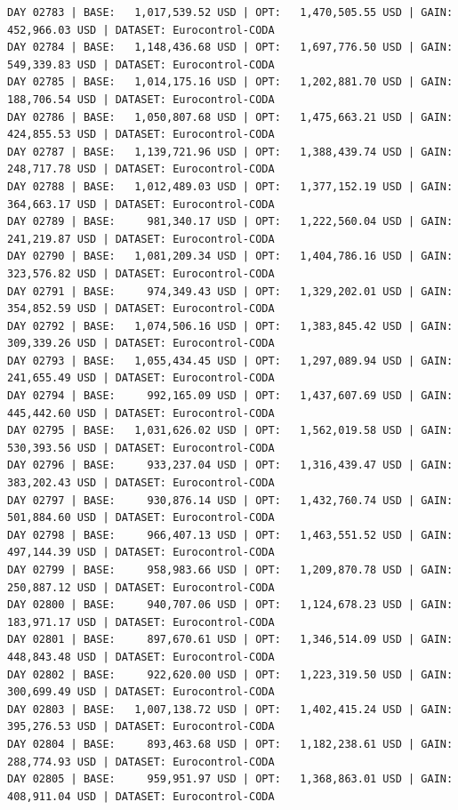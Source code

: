 \documentclass[11pt,a4paper]{article}
\begin{document}
\begin{verbatim}
DAY 02783 | BASE:   1,017,539.52 USD | OPT:   1,470,505.55 USD | GAIN: 452,966.03 USD | DATASET: Eurocontrol-CODA
DAY 02784 | BASE:   1,148,436.68 USD | OPT:   1,697,776.50 USD | GAIN: 549,339.83 USD | DATASET: Eurocontrol-CODA
DAY 02785 | BASE:   1,014,175.16 USD | OPT:   1,202,881.70 USD | GAIN: 188,706.54 USD | DATASET: Eurocontrol-CODA
DAY 02786 | BASE:   1,050,807.68 USD | OPT:   1,475,663.21 USD | GAIN: 424,855.53 USD | DATASET: Eurocontrol-CODA
DAY 02787 | BASE:   1,139,721.96 USD | OPT:   1,388,439.74 USD | GAIN: 248,717.78 USD | DATASET: Eurocontrol-CODA
DAY 02788 | BASE:   1,012,489.03 USD | OPT:   1,377,152.19 USD | GAIN: 364,663.17 USD | DATASET: Eurocontrol-CODA
DAY 02789 | BASE:     981,340.17 USD | OPT:   1,222,560.04 USD | GAIN: 241,219.87 USD | DATASET: Eurocontrol-CODA
DAY 02790 | BASE:   1,081,209.34 USD | OPT:   1,404,786.16 USD | GAIN: 323,576.82 USD | DATASET: Eurocontrol-CODA
DAY 02791 | BASE:     974,349.43 USD | OPT:   1,329,202.01 USD | GAIN: 354,852.59 USD | DATASET: Eurocontrol-CODA
DAY 02792 | BASE:   1,074,506.16 USD | OPT:   1,383,845.42 USD | GAIN: 309,339.26 USD | DATASET: Eurocontrol-CODA
DAY 02793 | BASE:   1,055,434.45 USD | OPT:   1,297,089.94 USD | GAIN: 241,655.49 USD | DATASET: Eurocontrol-CODA
DAY 02794 | BASE:     992,165.09 USD | OPT:   1,437,607.69 USD | GAIN: 445,442.60 USD | DATASET: Eurocontrol-CODA
DAY 02795 | BASE:   1,031,626.02 USD | OPT:   1,562,019.58 USD | GAIN: 530,393.56 USD | DATASET: Eurocontrol-CODA
DAY 02796 | BASE:     933,237.04 USD | OPT:   1,316,439.47 USD | GAIN: 383,202.43 USD | DATASET: Eurocontrol-CODA
DAY 02797 | BASE:     930,876.14 USD | OPT:   1,432,760.74 USD | GAIN: 501,884.60 USD | DATASET: Eurocontrol-CODA
DAY 02798 | BASE:     966,407.13 USD | OPT:   1,463,551.52 USD | GAIN: 497,144.39 USD | DATASET: Eurocontrol-CODA
DAY 02799 | BASE:     958,983.66 USD | OPT:   1,209,870.78 USD | GAIN: 250,887.12 USD | DATASET: Eurocontrol-CODA
DAY 02800 | BASE:     940,707.06 USD | OPT:   1,124,678.23 USD | GAIN: 183,971.17 USD | DATASET: Eurocontrol-CODA
DAY 02801 | BASE:     897,670.61 USD | OPT:   1,346,514.09 USD | GAIN: 448,843.48 USD | DATASET: Eurocontrol-CODA
DAY 02802 | BASE:     922,620.00 USD | OPT:   1,223,319.50 USD | GAIN: 300,699.49 USD | DATASET: Eurocontrol-CODA
DAY 02803 | BASE:   1,007,138.72 USD | OPT:   1,402,415.24 USD | GAIN: 395,276.53 USD | DATASET: Eurocontrol-CODA
DAY 02804 | BASE:     893,463.68 USD | OPT:   1,182,238.61 USD | GAIN: 288,774.93 USD | DATASET: Eurocontrol-CODA
DAY 02805 | BASE:     959,951.97 USD | OPT:   1,368,863.01 USD | GAIN: 408,911.04 USD | DATASET: Eurocontrol-CODA

\end{verbatim}
\end{document}
